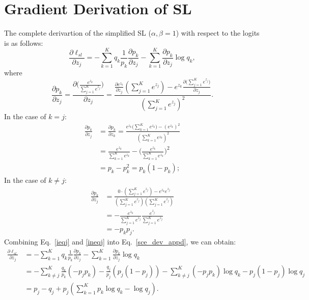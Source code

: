 \documentclass[10pt,twocolumn,letterpaper]{article}
\begin{document}
\section{Gradient Derivation of SL}\label{appendix_gradient}
The complete derivartion of the simplified SL ($\alpha, \beta = 1$) with respect to the logits is as follows:
\begin{equation}
\label{sce_dev_appd}
        \frac{\partial \ell_{sl}}{\partial z_j}  = - \sum_{k=1}^K q_k \frac{1}{p_k} \frac{\partial p_k}{\partial z_j}
        - \sum_{k=1}^K \frac{\partial p_k}{\partial z_j} \log q_k,
\end{equation}
where
\begin{equation}
        \frac{\partial p_k}{\partial z_j}  = \frac{\partial \Big(\frac{e^{z_k}}{\sum_{j=1}^K e^{z_j}}\Big)}{\partial z_j} = \frac{\frac{\partial e^{z_k}}{\partial z_j} (\sum_{j=1}^K e^{z_j}) - e^{z_k} \frac{\partial \big(\sum_{j=1}^K e^{z_j}\big) }{\partial z_j} }{(\sum_{j=1}^K e^{z_j})^2}.
\end{equation}
In the case of $ k = j$:
\begin{equation}
\label{ieqj}
    \begin{split}
        \frac{\partial p_k}{\partial z_j} & = \frac{\partial p_k}{\partial z_k} = \frac{e^{z_k}\big(\sum_{k=1}^K e^{z_k}\big) - (e^{z_k})^2}{(\sum_{k=1}^K e^{z_k})^2}\\
        & = \frac{e^{z_k}}{\sum_{k=1}^K e^{z_k}} - \Big(\frac{e^{z_k}}{\sum_{k=1}^K e^{z_k}} \Big)^2 \\
        & = p_k -p_k^2 = p_k(1-p_k);
    \end{split}
\end{equation}
In the case of $k \neq j$:
\begin{equation}
\label{ineqj}
    \begin{split}
        \frac{\partial p_k}{\partial z_j} & = \frac{0\cdot (\sum_{j=1}^K e^{z_j}) - e^{z_k}e^{z_j}}{(\sum_{j=1}^K e^{z_j})(\sum_{j=1}^K e^{z_j})} \\
        & = - \frac{e^{z_k}}{\sum_{j=1}^K e^{z_j}} \frac{e^{z_j}}{\sum_{j=1}^K e^{z_j}} \\
        & = -p_k p_j.
    \end{split}
\end{equation}
Combining Eq.~\eqref{ieqj} and \eqref{ineqj} into Eq.~\eqref{sce_dev_appd}, we can obtain:
\begin{equation}
\begin{aligned}
        \frac{\partial \ell_{sl}}{\partial z_j} & = - \sum_{k=1}^K q_k \frac{1}{p_k} \frac{\partial p_k}{\partial z_j}
        - \sum_{k=1}^K \frac{\partial p_k}{\partial z_j} \log q_k \\
        & = - \sum_{k \neq j}^K \frac{q_k}{p_k}(-p_j p_k) - \frac{q_j}{p_j}(p_j(1-p_j)) - \sum_{k \neq j}^K (-p_j p_k) \log q_k  - p_j(1-p_j)\log q_j \\
        & = p_j - q_j + p_j(\sum_{k=1}^K p_k \log q_k - \log q_j).
    \end{aligned}
\end{equation}
\end{document}
